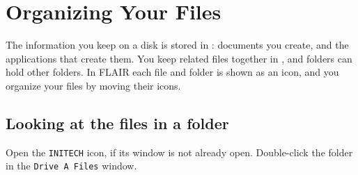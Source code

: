 \chapter{Organizing Your Files}
\label{ch:organizing}

The information you keep on a disk is stored in : documents
you create, and the applications that create them.  You keep related files
together in , and folders can hold other folders.  In FLAIR
each file and folder is shown as an icon, and you organize your files by
moving their icons.

\section{Looking at the files in a folder}
\begin{TaskSteps}
\Step Open the \texttt{INITECH} icon, if its window is not already open.
\Step Double-click the  folder in the \texttt{Drive A Files}
window.
\end{TaskSteps}


